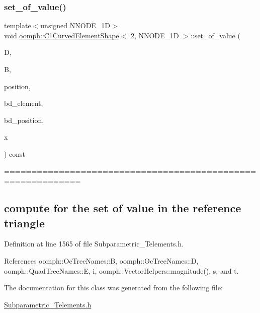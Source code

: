 \subsubsection{\texorpdfstring{set\+\_\+of\+\_\+value()}{set\_of\_value()}}
{\footnotesize\ttfamily template$<$unsigned N\+N\+O\+D\+E\+\_\+1D$>$ \\
void \hyperlink{classoomph_1_1C1CurvedElementShape}{oomph\+::\+C1\+Curved\+Element\+Shape}$<$ 2, N\+N\+O\+D\+E\+\_\+1D $>$\+::set\+\_\+of\+\_\+value (\begin{DoxyParamCaption}\item[{\hyperlink{classoomph_1_1DenseMatrix}{Dense\+Matrix}$<$ double $>$ \&}]{D,  }\item[{\hyperlink{classoomph_1_1DenseMatrix}{Dense\+Matrix}$<$ double $>$ \&}]{B,  }\item[{\hyperlink{classoomph_1_1DenseMatrix}{Dense\+Matrix}$<$ double $>$ \&}]{position,  }\item[{unsigned \&}]{bd\+\_\+element,  }\item[{\hyperlink{classoomph_1_1DenseMatrix}{Dense\+Matrix}$<$ double $>$ \&}]{bd\+\_\+position,  }\item[{\hyperlink{classoomph_1_1Vector}{Vector}$<$ double $>$ \&}]{x }\end{DoxyParamCaption}) const\hspace{0.3cm}{\ttfamily [inline]}}

============================================================ \subsection*{compute for the set of value in the reference triangle }

Definition at line 1565 of file Subparametric\+\_\+\+Telements.\+h.



References oomph\+::\+Oc\+Tree\+Names\+::B, oomph\+::\+Oc\+Tree\+Names\+::D, oomph\+::\+Quad\+Tree\+Names\+::E, i, oomph\+::\+Vector\+Helpers\+::magnitude(), s, and t.



The documentation for this class was generated from the following file\+:\begin{DoxyCompactItemize}
\item 
\hyperlink{Subparametric__Telements_8h}{Subparametric\+\_\+\+Telements.\+h}\end{DoxyCompactItemize}
